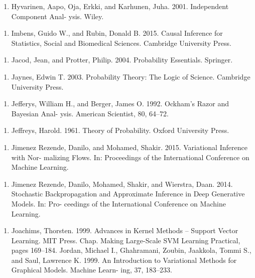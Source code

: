 \begin{enumerate}
\item Hyvarinen, Aapo, Oja, Erkki, and Karhunen, Juha. 2001. Independent Component Anal- ysis. Wiley.
\end{enumerate}

\begin{enumerate}
\item Imbens, Guido W., and Rubin, Donald B. 2015. Causal Inference for Statistics, Social and Biomedical Sciences. Cambridge University Press.
\end{enumerate}

\begin{enumerate}
\item Jacod, Jean, and Protter, Philip. 2004. Probability Essentials. Springer.
\end{enumerate}

\begin{enumerate}
\item Jaynes, Edwin T. 2003. Probability Theory: The Logic of Science. Cambridge University Press.
\end{enumerate}

\begin{enumerate}
\item Jefferys, William H., and Berger, James O. 1992. Ockham’s Razor and Bayesian Anal- ysis. American Scientist, 80, 64–72.
\end{enumerate}

\begin{enumerate}
\item Jeffreys, Harold. 1961. Theory of Probability. Oxford University Press.
\end{enumerate}

\begin{enumerate}
\item Jimenez Rezende, Danilo, and Mohamed, Shakir. 2015. Variational Inference with Nor- malizing Flows. In: Proceedings of the International Conference on Machine Learning.
\end{enumerate}

\begin{enumerate}
\item Jimenez Rezende, Danilo, Mohamed, Shakir, and Wierstra, Daan. 2014. Stochastic Backpropagation and Approximate Inference in Deep Generative Models. In: Pro- ceedings of the International Conference on Machine Learning.
\end{enumerate}

\begin{enumerate}
\item Joachims, Thorsten. 1999. Advances in Kernel Methods – Support Vector Learning. MIT Press. Chap. Making Large-Scale SVM Learning Practical, pages 169–184. Jordan, Michael I., Ghahramani, Zoubin, Jaakkola, Tommi S., and Saul, Lawrence K. 1999. An Introduction to Variational Methods for Graphical Models. Machine Learn- ing, 37, 183–233.
\end{enumerate}

